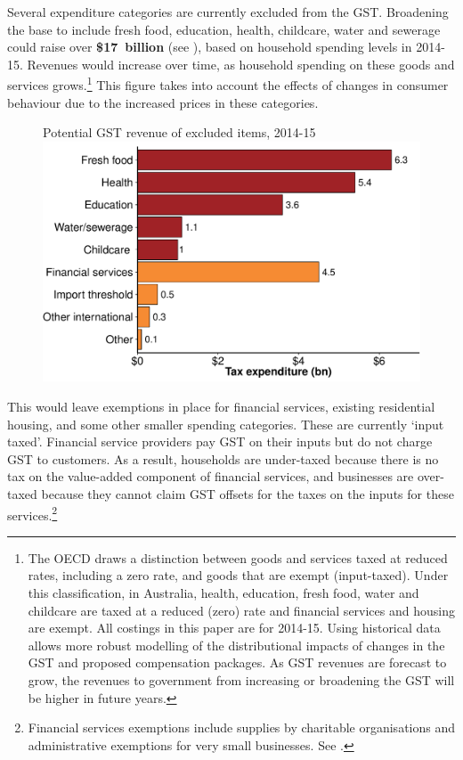 Several expenditure categories are currently excluded from the GST.  Broadening the base to include fresh food, education, health, childcare, water and sewerage could raise over \textbf{\$17~billion} (see ), based on household spending levels in 2014-15. Revenues would increase over time, as household spending on these goods and services grows.\footnote{The OECD draws a distinction between goods and services taxed at reduced rates, including a zero rate, and goods that are exempt (input-taxed). Under this classification, in Australia, health, education, fresh food, water and childcare are taxed at a reduced (zero) rate and financial services and housing are exempt. All costings in this paper are for 2014-15. Using historical data allows more robust modelling of the distributional impacts of changes in the GST and proposed compensation packages. As GST revenues are forecast to grow, the revenues to government from increasing or broadening the GST will be higher in future years.} This figure takes into account the effects of changes in consumer behaviour due to the increased prices in these categories. 

\begin{figure}
%
{Potential GST revenue of excluded items, 2014-15}
\includegraphics[width=\columnwidth]{atlas/GST_revenue_of_excluded_items1415-1.pdf}

\end{figure}

This would leave exemptions in place for financial services, existing residential housing, and some other smaller spending categories.  These are currently ‘input taxed’. Financial service providers pay GST on their inputs but do not charge GST to customers.  As a result, households are under-taxed because there is no tax on the value-added component of financial services, and businesses are over-taxed because they cannot claim GST offsets for the taxes on the inputs for these services.\footnote{Financial services exemptions include supplies by charitable organisations and administrative exemptions for very small businesses. See \textcite[][169]{Treasury2014TES2013}.}

